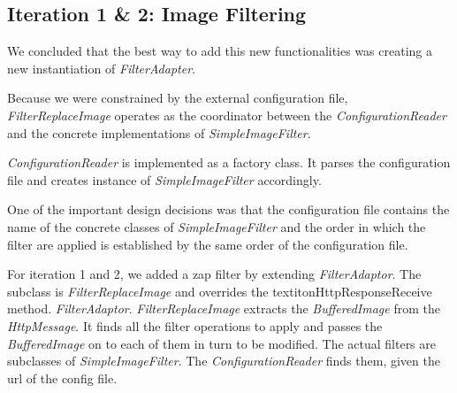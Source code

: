 \subsection{Iteration 1 \& 2: Image Filtering}
We concluded that the best way to add this new functionalities was creating a new instantiation of  \textit{FilterAdapter}.
\par
Because we were constrained by the external configuration file, \textit{FilterReplaceImage} operates as the coordinator between the  \textit{ConfigurationReader} and the concrete implementations of \textit{SimpleImageFilter}.
\par
\textit{ConfigurationReader} is implemented as a factory class. It parses the configuration file and creates instance of \textit{SimpleImageFilter} accordingly.
\par
One of the important design decisions was that the configuration file contains the name of the concrete classes of  \textit{SimpleImageFilter} and  the order in which the filter are applied is established by the same order of the configuration file.
\par
For iteration 1 and 2, we added a zap filter by extending \textit{FilterAdaptor}. The subclass is \textit{FilterReplaceImage} and overrides the textit{onHttpResponseReceive} method. \textit{FilterAdaptor}. \textit{FilterReplaceImage} extracts the \textit{BufferedImage} from the \textit{HttpMessage}. It finds all the filter operations to apply and passes the \textit{BufferedImage} on to each of them in turn to be modified.
The actual filters are subclasses of \textit{SimpleImageFilter}. The \textit{ConfigurationReader} finds them, given the url of the config file.

